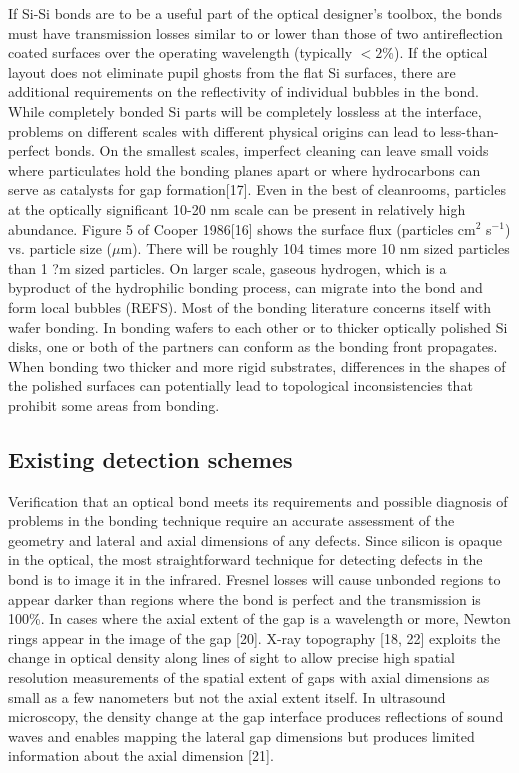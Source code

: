 \documentclass[osajnl,preprint,showpacs,superscriptaddress,12pt]{revtex4-1} %
\begin{document}
If Si-Si bonds are to be a useful part of the optical designer's toolbox, the bonds must have transmission losses similar to or lower than those of two antireflection coated surfaces over the operating wavelength (typically $< 2$\%).  If the optical layout does not eliminate pupil ghosts from the flat Si surfaces, there are additional requirements on the reflectivity of individual bubbles in the bond. While completely bonded Si parts will be completely lossless at the interface, problems on different scales with different physical origins can lead to less-than-perfect bonds.  On the smallest scales, imperfect cleaning can leave small voids where particulates hold the bonding planes apart or where hydrocarbons can serve as catalysts for gap formation[17].  Even in the best of cleanrooms, particles at the optically significant 10-20 nm scale can be present in relatively high abundance. Figure 5 of Cooper 1986[16] shows the surface flux (particles cm$^2$ s$^{-1}$) vs. particle size ($\mu$m). There will be roughly 104 times more 10 nm sized particles than 1 ?m sized particles.  On larger scale, gaseous hydrogen, which is a byproduct of the  hydrophilic bonding process, can migrate into the bond and form local bubbles (REFS).  Most of the bonding literature concerns itself with wafer bonding.  In bonding wafers to each other or to thicker optically polished Si disks, one or both of the partners can conform as the bonding front propagates.  When bonding two thicker and more rigid substrates, differences in the shapes of the polished surfaces can potentially lead to topological inconsistencies that prohibit some areas from bonding.

\subsection{Existing detection schemes}
Verification that an optical bond meets its requirements and possible diagnosis of problems in the bonding technique require an accurate assessment of the geometry and lateral and axial dimensions of any defects.  Since silicon is opaque in the optical, the most straightforward technique for detecting defects in the bond is to image it in the infrared.  Fresnel losses will cause unbonded regions to appear darker than regions where the bond is perfect and the transmission is 100\%.  In cases where the axial extent of the gap is a wavelength or more, Newton rings appear in the image of the gap [20].  X-ray topography [18, 22] exploits the change in optical density along lines of sight to allow precise high spatial resolution measurements of the spatial extent of gaps with axial dimensions as small as a few nanometers but not the axial extent itself. In ultrasound microscopy, the density change at the gap interface produces reflections of sound waves and enables mapping the lateral gap dimensions but produces limited information about the axial dimension [21].
\end{document}
